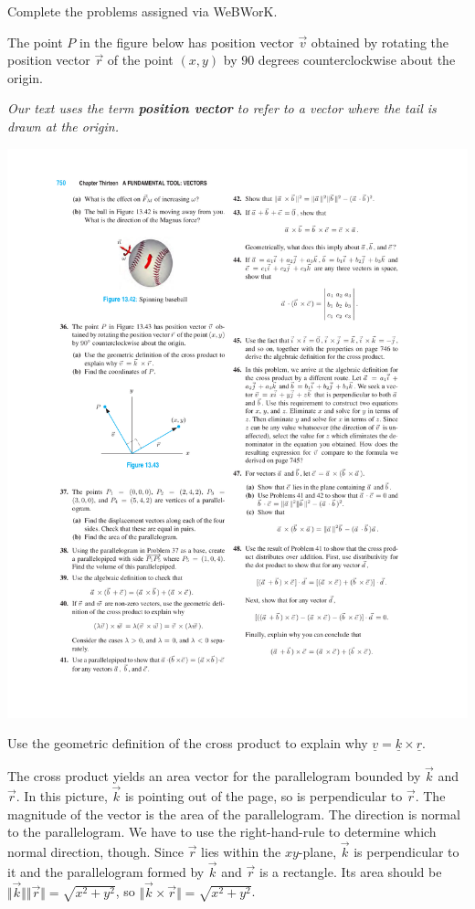\documentclass[12pt,letterpaper]{exam}
\newcommand{\mb}[1]{\underline{#1}}
\begin{document}
\begin{questions}
\question Complete the problems assigned via WeBWorK.

\question The point $P$ in the figure below has position vector $\vec{v}$ obtained by rotating the position vector $\vec{r}$ of the point $(x,y)$ by $90$ degrees counterclockwise about the origin.

\emph{Our text uses the term \textbf{position vector} to refer to a vector where the tail is drawn at the origin.}

\includegraphics{img/HW04p2.pdf}

\begin{parts}
\item Use the geometric definition of the cross product to explain why $\mb{v} = \mb{k} \times \mb{r}$.
\begin{solution}
The cross product yields an area vector for the parallelogram bounded by $\vec k$ and $\vec r$.  In this picture, $\vec k$ is pointing out of the page, so is perpendicular to $\vec r$.  The magnitude of the vector is the area of the parallelogram.  The direction is normal to the parallelogram.  We have to use the right-hand-rule to determine which normal direction, though. Since $\vec{r}$ lies within the $xy$-plane, $\vec{k}$ is perpendicular to it and the parallelogram formed by $\vec{k}$ and $\vec{r}$ is a rectangle.  Its area should be $\Vert \vec{k}\Vert\Vert\vec{r}\Vert = \sqrt{x^2+y^2}$, so $\Vert \vec{k}\times\vec{r}\Vert = \sqrt{x^2+y^2}$.


\end{solution}
\end{parts}
\end{questions}
\end{document}
